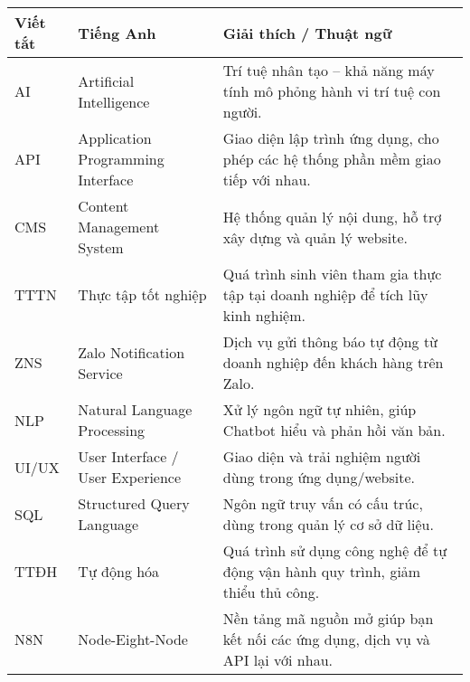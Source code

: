 \begin{category}
\begin{center}
\begin{tabular}{|m{3cm}|m{4cm}|m{8cm}|}
\hline
\textbf{Viết tắt} & \textbf{Tiếng Anh} & \textbf{Giải thích / Thuật ngữ} \\
\hline
AI & Artificial Intelligence & Trí tuệ nhân tạo – khả năng máy tính mô phỏng hành vi trí tuệ con người. \\
\hline
API & Application Programming Interface & Giao diện lập trình ứng dụng, cho phép các hệ thống phần mềm giao tiếp với nhau. \\
\hline
CMS & Content Management System & Hệ thống quản lý nội dung, hỗ trợ xây dựng và quản lý website. \\
\hline
TTTN & Thực tập tốt nghiệp & Quá trình sinh viên tham gia thực tập tại doanh nghiệp để tích lũy kinh nghiệm. \\
\hline
ZNS & Zalo Notification Service & Dịch vụ gửi thông báo tự động từ doanh nghiệp đến khách hàng trên Zalo. \\
\hline
NLP & Natural Language Processing & Xử lý ngôn ngữ tự nhiên, giúp Chatbot hiểu và phản hồi văn bản. \\
\hline
UI/UX & User Interface / User Experience & Giao diện và trải nghiệm người dùng trong ứng dụng/website. \\
\hline
SQL & Structured Query Language & Ngôn ngữ truy vấn có cấu trúc, dùng trong quản lý cơ sở dữ liệu. \\
\hline
TTĐH & Tự động hóa & Quá trình sử dụng công nghệ để tự động vận hành quy trình, giảm thiểu thủ công. \\
\hline
N8N & Node-Eight-Node & Nền tảng mã nguồn mở giúp bạn kết nối các ứng dụng, dịch vụ và API lại với nhau. \\
\hline
\end{tabular}
\end{center}

\end{category}